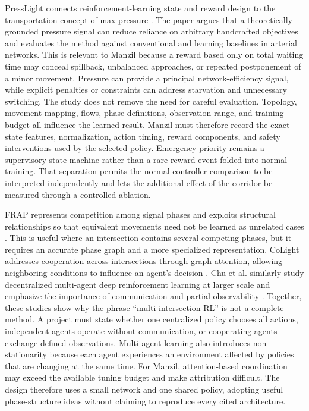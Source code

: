 PressLight connects reinforcement-learning state and reward design to the transportation concept of max pressure \cite{wei2019presslight}. The paper argues that a theoretically grounded pressure signal can reduce reliance on arbitrary handcrafted objectives and evaluates the method against conventional and learning baselines in arterial networks. This is relevant to Manzil because a reward based only on total waiting time may conceal spillback, unbalanced approaches, or repeated postponement of a minor movement. Pressure can provide a principal network-efficiency signal, while explicit penalties or constraints can address starvation and unnecessary switching. The study does not remove the need for careful evaluation. Topology, movement mapping, flows, phase definitions, observation range, and training budget all influence the learned result. Manzil must therefore record the exact state features, normalization, action timing, reward components, and safety interventions used by the selected policy. Emergency priority remains a supervisory state machine rather than a rare reward event folded into normal training. That separation permits the normal-controller comparison to be interpreted independently and lets the additional effect of the corridor be measured through a controlled ablation.

FRAP represents competition among signal phases and exploits structural relationships so that equivalent movements need not be learned as unrelated cases \cite{zheng2019frap}. This is useful where an intersection contains several competing phases, but it requires an accurate phase graph and a more specialized representation. CoLight addresses cooperation across intersections through graph attention, allowing neighboring conditions to influence an agent's decision \cite{wei2019colight}. Chu et al. similarly study decentralized multi-agent deep reinforcement learning at larger scale and emphasize the importance of communication and partial observability \cite{chu2020marl}. Together, these studies show why the phrase ``multi-intersection RL'' is not a complete method. A project must state whether one centralized policy chooses all actions, independent agents operate without communication, or cooperating agents exchange defined observations. Multi-agent learning also introduces non-stationarity because each agent experiences an environment affected by policies that are changing at the same time. For Manzil, attention-based coordination may exceed the available tuning budget and make attribution difficult. The design therefore uses a small network and one shared policy, adopting useful phase-structure ideas without claiming to reproduce every cited architecture.

